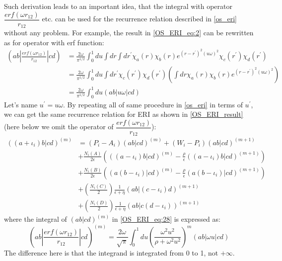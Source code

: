 Such derivation leads to an important idea, that the integral with operator 
$\dfrac{erf(\omega r_{12})}{r_{12}}$ etc. can be used for the recurrence relation described
in \ref{os_eri} without any problem. For example, the result in \ref{OS_ERI_eq:2}
can be rewritten as for operator with erf function:
\begin{equation}
 \begin{split}
 (ab|\frac{erf(\omega r_{12})}{r_{12}}|cd) &= \frac{2\omega}{\pi^{1/2}}\int^{1}_{0} du 
\int dr \int dr^{'} \chi_{a}(r)\chi_{b}(r) e^{(r-r^{'})^{2}(u\omega)^{2}}
\chi_{c}(r^{'})\chi_{d}(r^{'}) \\
&= \frac{2\omega}{\pi^{1/2}}\int^{1}_{0} du
\int dr^{'}\chi_{c}(r^{'})\chi_{d}(r^{'}) 
\left( \int dr  \chi_{a}(r)\chi_{b}(r) e^{(r-r^{'})^{2}(u\omega)^{2}}\right) \\ 
&= \frac{2\omega}{\pi^{1/2}}\int^{1}_{0} du (ab|u\omega|cd)
 \end{split}
\end{equation}
Let's name $u^{'} = u\omega$. By repeating all of same procedure in \ref{os_eri} in terms of
$u^{'}$, we can get the same recurrence relation for ERI as shown in \ref{OS_ERI_result}(here 
below we omit the operator of $\dfrac{erf(\omega r_{12})}{r_{12}}$):
\begin{equation}
 \begin{split}
((a+\iota_{i})b|cd)^{(m)} &= (P_{i} - A_{i})(ab|cd)^{(m)} +
\left(W_{i} -P_{i}\right)(ab|cd)^{(m+1)} \\
&+\frac{N_{i}(A)}{2\epsilon}\left(((a-\iota_{i})b|cd)^{(m)}-\frac{\rho}{
\epsilon }((a-\iota_{i})b|cd)^{(m+1)}\right)  \\
&+\frac{N_{i}(B)}{2\epsilon}\left((a(b-\iota_{i})|cd)^{(m)}-\frac{\rho}{
\epsilon }(a(b-\iota_{i})|cd)^{(m+1)}\right)  \\
&+\left(\frac{N_{i}(C)}{2}\right)\frac{1}{\epsilon+\eta}
(ab|(c-\iota_{i})d)^{(m+1)} \\
&+\left(\frac{N_{i}(D)}{2}\right)\frac{1}{\epsilon+\eta}
(ab|c(d-\iota_{i}))^{(m+1)}
\end{split}
\label{erf_coulomb_integral:8}
\end{equation}
where the integral of $(ab|cd)^{(m)}$ in \ref{OS_ERI_eq:28} is expressed as:
\begin{equation}
\label{erf_coulomb_integral:9}
 (ab|\frac{erf(\omega r_{12})}{r_{12}}|cd)^{(m)} = \frac{2\omega}{\sqrt{\pi}}\int^{1}_{0} du \left( 
 \frac{\omega^{2}u^{2}}{\rho+\omega^{2}u^{2}}\right)^{m}(ab|\omega u|cd) 
\end{equation}
The difference here is that the integrand is integrated from 0 to 1, not $+\infty$.

